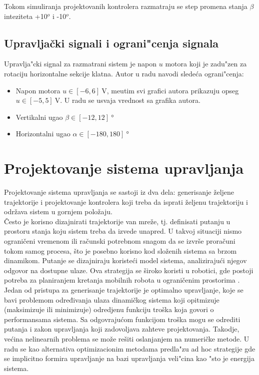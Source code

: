 \documentclass[a4paper,11pt]{article}
\theoremstyle{definition} \newtheorem{deff}{Definicija}[section]
\theoremstyle{definition} \newtheorem{prim}[deff]{Primer}
\theoremstyle{plain} \newtheorem{teor}[deff]{Teorema}
\begin{document}
	 Tokom simuliranja projektovanih kontrolera razmatraju se step promena stanja $\beta$ inteziteta +10$^o$ i -10$^o$. \\[16pt]
	 

	\subsection{Upravljački signali i ograni"cenja signala}
	
	Upravlja"cki signal za razmatrani sistem je napon $u$ motora koji je zadu"zen za rotaciju horizontalne sekcije klatna. Autor u radu \cite{inicijalna} navodi slede\'ca ograni"cenja:
	
	\begin{itemize}
		\item Napon motora $u \in [-6, 6] ~\text{V}$, me\dj utim svi grafici autora prikazuju opseg $u \in [-5, 5] ~\text{V}$. U radu se usvaja vrednost sa grafika autora.
		\item Vertikalni ugao  $\beta \in [-12, 12] ~\text{°}$
		\item Horizontalni ugao  $\alpha \in [-180, 180] ~\text{°}$
	\end{itemize}
	
	\clearpage
	
	
	\section{Projektovanje sistema upravljanja}
	
	Projektovanje sistema upravljanja se sastoji iz dva dela: generisanje željene trajektorije i projektovanje kontrolera koji treba da isprati željenu trajektoriju i održava sistem u gornjem položaju. \\
	
	Često je korisno dizajnirati trajektorije van mreže, tj. definisati putanju u prostoru stanja koju sistem treba da izvede unapred. U takvoj situaciji nismo ograničeni vremenom ili računski potrebnom snagom da se izvrše proračuni tokom samog procesa, što je posebno korisno kod složenih sistema sa brzom dinamikom. Putanje se dizajniraju koristeći model sistema, analizirajući njegov odgovor na dostupne ulaze. Ova strategija se široko koristi u robotici, gde postoji potreba za planiranjem kretanja mobilnih robota u ograničenim prostorima \cite{inicijalna}. \\
	
	Jedan od pristupa za generisanje trajektorije je optimalno upravljanje,  koje se bavi problemom određivanja ulaza dinamičkog sistema koji opitmizuje (maksimizuje ili minimizuje) odredjenu funkciju troška koja govori o performansama sistema. Sa odgovrajućom funkcijom troška mogu se odrediti putanja i zakon upravljanja koji zadovoljava zahteve projektovanja. Takodje, većina nelinearnih problema se može rešiti oslanjanjem na numeričke metode. U radu se \cite{inicijalna} kao alternativa optimizacionim metodama predla"zu ad hoc strategije gde se implicitno formira upravljanje na bazi upravljanja veli"cina kao "sto je energija sistema. \\
	
\end{document}
